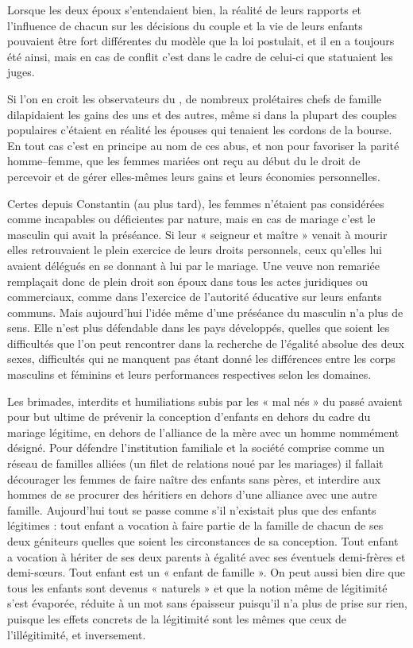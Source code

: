  Lorsque les deux époux s'entendaient bien, la réalité de leurs rapports et l'influence de chacun sur les décisions du couple et la vie de leurs enfants pouvaient être fort différentes du modèle que la loi postulait, et il en a toujours été ainsi, mais en cas de conflit c'est dans le cadre de celui-ci que statuaient les juges.

 Si l'on en croit les observateurs du , de nombreux prolétaires chefs de famille dilapidaient les gains des uns et des autres, même si dans la plupart des couples populaires c'étaient en réalité les épouses qui tenaient les cordons de la bourse. En tout cas c'est en principe au nom de ces abus, et non pour favoriser la parité homme--femme, que les femmes mariées ont reçu au début du  le droit de percevoir et de gérer elles-mêmes leurs gains et leurs économies personnelles.

 Certes depuis Constantin (au plus tard), les femmes n'étaient pas considérées comme incapables ou déficientes par nature, mais en cas de mariage c'est le masculin qui avait la préséance. Si leur « seigneur et maître » venait à mourir elles retrouvaient le plein exercice de leurs droits personnels, ceux qu'elles lui avaient délégués en se donnant à lui par le mariage. Une veuve non remariée remplaçait donc de plein droit son époux dans tous les actes juridiques ou commerciaux, comme dans l'exercice de l'autorité éducative sur leurs enfants communs. Mais aujourd'hui l'idée même d'une préséance du masculin n'a plus de sens. Elle n'est plus défendable dans les pays développés, quelles que soient les difficultés que l'on peut rencontrer dans la recherche de l'égalité absolue des deux sexes, difficultés qui ne manquent pas étant donné les différences entre les corps masculins et féminins et leurs performances respectives selon les domaines.

 Les brimades, interdits et humiliations subis par les « mal nés » du passé avaient pour but ultime de prévenir la conception d'enfants en dehors du cadre du mariage légitime, en dehors de l'alliance de la mère avec un homme nommément désigné. Pour défendre l'institution familiale et la société comprise comme un réseau de familles alliées (un filet de relations noué par les mariages) il fallait décourager les femmes de faire naître des enfants sans pères, et interdire aux hommes de se procurer des héritiers en dehors d'une alliance avec une autre famille. Aujourd'hui tout se passe comme s'il n'existait plus que des enfants légitimes : tout enfant a vocation à faire partie de la famille de chacun de ses deux géniteurs quelles que soient les circonstances de sa conception. Tout enfant a vocation à hériter de ses deux parents à égalité avec ses éventuels demi-frères et demi-sœurs. Tout enfant est un « enfant de famille ». On peut aussi bien dire que tous les enfants sont devenus « naturels » et que la notion même de légitimité s'est évaporée, réduite à un mot sans épaisseur puisqu'il n'a plus de prise sur rien, puisque les effets concrets de la légitimité sont les mêmes que ceux de l'illégitimité, et inversement. 

